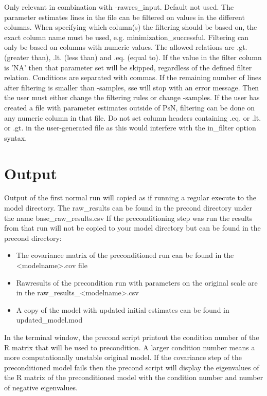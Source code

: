 \begin{optionlist}
Only relevant in combination with -rawres\_input. Default not used. The parameter estimates lines in the file can be filtered on values in the different columns. When specifying which column(s) the filtering should be based on, the exact column name must be used, e.g. minimization\_successful. Filtering can only be based on columns with numeric values. The allowed relations are .gt. (greater than), .lt. (less than) and .eq. (equal to). If the value in the filter column is 'NA' then that parameter set will be skipped, regardless of the defined filter relation. Conditions are separated with commas. If the remaining number of lines after filtering is smaller than -samples, sse will stop with an error message. Then the user must either change the filtering rules or change -samples. If the user has created a file with parameter estimates outside of PsN, filtering can be done on any numeric column in that file. Do not set column headers containing .eq. or .lt. or .gt. in the user-generated file as this would interfere with the in\_filter option syntax.
\nextopt
\end{optionlist}

\section{Output}
Output of the first normal run will copied as if running a regular execute to the model directory. The raw\_results can be found
in the precond directory under the name base\_raw\_results.csv
If the preconditioning step was run the results from that run will not be copied to your model directory but can be found
in the precond directory:

\begin{itemize}
    \item The covariance matrix of the preconditioned run can be found in the <modelname>.cov file
    \item Rawresults of the precondition run with parameters on the original scale are in the raw\_results\_<modelname>.csv
    \item A copy of the model with updated initial estimates can be found in updated\_model.mod
\end{itemize}
 

In the terminal window, the precond script printout the condition number of the R matrix that will be used to precondition.  A larger condition number means a more computationally unstable original model. If the covariance step of the preconditioned model fails then the precond script will display the eigenvalues of the R matrix of the preconditioned model with the condition number and number of negative eigenvalues.  

